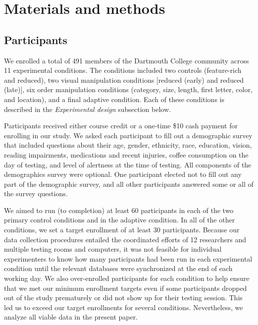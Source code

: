\documentclass[11pt]{article}
\begin{document}
\section*{Materials and methods}

\subsection*{Participants}

We enrolled a total of 491 members of the Dartmouth College community across 11
experimental conditions. The conditions included two controls (feature-rich and
reduced), two visual manipulation conditions [reduced (early) and reduced
(late)], six order manipulation conditions (category, size, length, first
letter, color, and location), and a final adaptive condition. Each of these
conditions is described in the \textit{Experimental design} subsection below.

Participants received either course credit or a one-time \$10 cash payment for
enrolling in our study. We asked each participant to fill out a demographic
survey that included questions about their age, gender, ethnicity, race,
education, vision, reading impairments, medications and recent injuries, coffee
consumption on the day of testing, and level of alertness at the time of
testing. All components of the demographics survey were optional. One
participant elected not to fill out any part of the demographic survey, and all
other participants answered some or all of the survey questions.

We aimed to run (to completion) at least 60 participants in each of the two
primary control conditions and in the adaptive condition. In all of the other
conditions, we set a target enrollment of at least 30 participants. Because our
data collection procedures entailed the coordinated efforts of 12 researchers
and multiple testing rooms and computers, it was not feasible for individual
experimenters to know how many participants had been run in each experimental
condition until the relevant databases were synchronized at the end of each
working day. We also over-enrolled participants for each condition to help
ensure that we met our minimum enrollment targets even if some participants
dropped out of the study prematurely or did not show up for their testing
session. This led us to exceed our target enrollments for several conditions.
Nevertheless, we analyze all viable data in the present paper.
\end{document}
